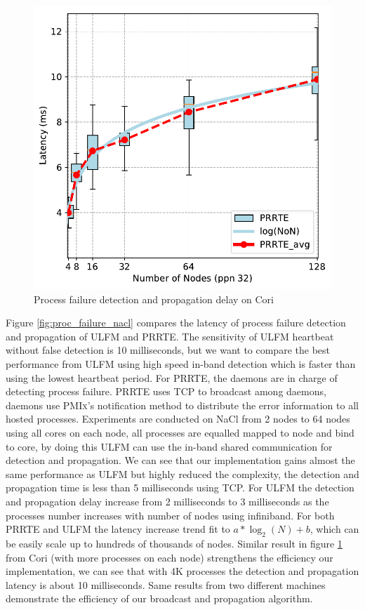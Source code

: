 \documentclass[sigconf]{acmart}
\newcommand{\prrte}[0]{\textsc{PRRTE}\xspace}
\newcommand{\pmix}[0]{\textsc{PMIx}\xspace}
\newcommand{\ulfm}[0]{\textsc{ULFM}\xspace}
\begin{document}
\begin{figure}[h]
  \centering
  \includegraphics[width=\linewidth]{Cori_Process_Failure_fit.pdf}
  \caption{Process failure detection and propagation delay on Cori}
  \label{fig:proc_failure_cori}
\end{figure}

Figure \ref{fig:proc_failure_nacl} compares the latency of process failure detection and propagation of \ulfm and \prrte. The sensitivity of \ulfm heartbeat without false detection is 10 milliseconds, but we want to compare the best performance from \ulfm using high speed in-band detection which is faster than using the lowest heartbeat period. For \prrte, the daemons are in charge of detecting process failure. \prrte uses TCP to broadcast among daemons, daemons use \pmix's notification method to distribute the error information to all hosted processes. Experiments are conducted on NaCl from 2 nodes to 64 nodes using all cores on each node, all processes are equalled mapped to node and bind to core, by doing this \ulfm can use the in-band shared communication for detection and propagation. We can see that our implementation gains almost the same performance as \ulfm but highly reduced the complexity, the detection and propagation time is less than 5 milliseconds using TCP. For \ulfm the detection and propagation delay increase from 2 milliseconds to 3 milliseconds as the processes number increases with number of nodes using infiniband. For both \prrte and \ulfm the latency increase trend fit to $ a*\log_2(N) + b $, which can be easily scale up to hundreds of thousands of nodes. Similar result in figure \ref{fig:proc_failure_cori} from Cori (with more processes on each node) strengthens the efficiency our implementation, we can see that with 4K processes the detection and propagation latency is about 10 milliseconds. Same results from two different machines demonstrate the efficiency of our broadcast and propagation algorithm.  
\end{document}

